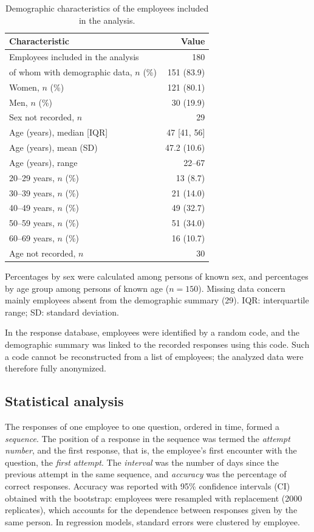 \documentclass[preprint,12pt,authoryear]{elsarticle}
\newcommand{\uwagatabeli}[1]{\par\vspace{2pt}\parbox{\linewidth}{\footnotesize #1}}
\begin{document}
\begin{table}[H]
\centering
\caption{Demographic characteristics of the employees included in the analysis.}
\label{tab:demografia}
\small
\begin{tabular}{lr}
\toprule
Characteristic & Value \\
\midrule
Employees included in the analysis & 180 \\
of whom with demographic data, $n$ (\%) & 151 (83.9) \\
\midrule
Women, $n$ (\%) & 121 (80.1) \\
Men, $n$ (\%) & 30 (19.9) \\
Sex not recorded, $n$ & 29 \\
\midrule
Age (years), median [IQR] & 47 [41, 56] \\
Age (years), mean (SD) & 47.2 (10.6) \\
Age (years), range & 22--67 \\
\midrule
20--29 years, $n$ (\%) & 13 (8.7) \\
30--39 years, $n$ (\%) & 21 (14.0) \\
40--49 years, $n$ (\%) & 49 (32.7) \\
50--59 years, $n$ (\%) & 51 (34.0) \\
60--69 years, $n$ (\%) & 16 (10.7) \\
Age not recorded, $n$ & 30 \\
\bottomrule
\end{tabular}
\uwagatabeli{Percentages by sex were calculated among persons of known sex, and percentages by age
group among persons of known age ($n = 150$). Missing data concern mainly employees absent from
the demographic summary (29). IQR: interquartile range; SD: standard deviation.}
\end{table}

In the response database, employees were identified by a random code, and the demographic summary was
linked to the recorded responses using this code. Such a code cannot be reconstructed from a list of
employees; the analyzed data were therefore fully anonymized.

\subsection{Statistical analysis}
\label{sec:analiza}
The responses of one employee to one question, ordered in time, formed a \emph{sequence}. The position
of a response in the sequence was termed the \emph{attempt number}, and the first response, that is,
the employee's first encounter with the question, the \emph{first attempt}. The \emph{interval} was the
number of days since the previous attempt in the same sequence, and \emph{accuracy} was the percentage
of correct responses. Accuracy was reported with 95\% confidence intervals (CI) obtained with the
bootstrap: employees were resampled with replacement (2000 replicates), which accounts for the
dependence between responses given by the same person. In regression models, standard errors were
clustered by employee.
\end{document}
